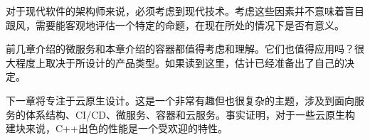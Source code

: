 对于现代软件的架构师来说，必须考虑到现代技术。考虑这些因素并不意味着盲目跟风，需要能客观地评估一个特定的命题，在现在所处的情况下是否有意义。

前几章介绍的微服务和本章介绍的容器都值得考虑和理解。它们也值得应用吗？很大程度上取决于所设计的产品类型。如果读到这里，估计已经准备出了自己的决定。

下一章将专注于云原生设计。这是一个非常有趣但也很复杂的主题，涉及到面向服务的体系结构、CI/CD、微服务、容器和云服务。事实证明，对于一些云原生构建块来说，C++出色的性能是一个受欢迎的特性。
